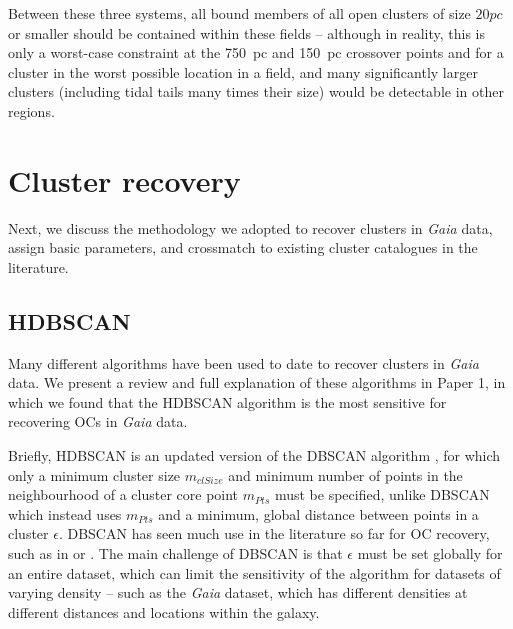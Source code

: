 Between these three systems, all bound members of all open clusters of size $20 pc$ or smaller should be contained within these fields -- although in reality, this is only a worst-case constraint at the 750~pc and 150~pc crossover points and for a cluster in the worst possible location in a field, and many significantly larger clusters (including tidal tails many times their size) would be detectable in other regions.



\section{Cluster recovery}\label{c3:sec:clustering}  %

Next, we discuss the methodology we adopted to recover clusters in \emph{Gaia} data, assign basic parameters, and crossmatch to existing cluster catalogues in the literature.

\subsection{HDBSCAN}

Many different algorithms have been used to date to recover clusters in \emph{Gaia} data. We present a review and full explanation of these algorithms in Paper 1, in which we found that the HDBSCAN algorithm \citep{hutchison_hdbscan_2013, mcinnes_hdbscan_2017} is the most sensitive for recovering OCs in \emph{Gaia} data. 

Briefly, HDBSCAN is an updated version of the DBSCAN algorithm \citep{ester_density-based_1996}, for which only a minimum cluster size $m_{clSize}$ and minimum number of points in the neighbourhood of a cluster core point $m_{Pts}$ must be specified, unlike DBSCAN which instead uses $m_{Pts}$ and a minimum, global distance between points in a cluster $\epsilon$. DBSCAN has seen much use in the literature so far for OC recovery, such as in \cite{castro-ginard_new_2018, castro-ginard_hunting_2019, castro-ginard_hunting_2020, castro-ginard_hunting_2022} or \cite{he_catalogue_2021, he_new_2022}. The main challenge of DBSCAN is that $\epsilon$ must be set globally for an entire dataset, which can limit the sensitivity of the algorithm for datasets of varying density -- such as the \emph{Gaia} dataset, which has different densities at different distances and locations within the galaxy. 

